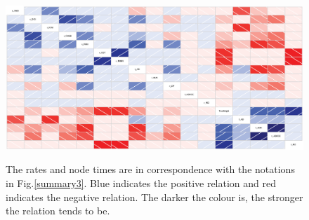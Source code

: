 \documentclass{bmcart}
\begin{document}
\begin{backmatter}
\begin{figure}[h!]
\centering
{}
\caption{
             }
\label{fixedtree}
\end{figure}

\begin{figure}[h!]
\includegraphics[width=12cm]{rateandtime.eps}\\
\caption{
             The rates and node times are in correspondence with the notations in Fig.\ref{summary3}. Blue indicates the positive relation and red indicates the negative relation. The darker the colour is, the stronger the relation tends to be.}
\label{correlation}
\end{figure}

\end{backmatter}
\end{document}
